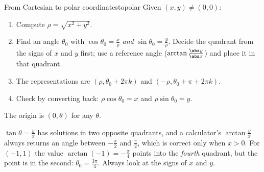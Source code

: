 \documentclass[11pt]{article}
\begin{document}
\begin{proc}{From Cartesian to polar coordinates}{topolar}
Given $(x,y)\ne(0,0)$:
\begin{enumerate}[nosep]
  \item Compute $\rho=\sqrt{x^2+y^2}$.
  \item Find an angle $\theta_0$ with $\cos\theta_0=\frac x\rho$ \emph{and} $\sin\theta_0=\frac y\rho$. Decide the quadrant from the signs of $x$ and $y$ first; use a reference angle ($\arctan\frac{\abs y}{\abs x}$) and place it in that quadrant.
  \item The representations are $(\rho,\theta_0+2\pi k)$ and $(-\rho,\theta_0+\pi+2\pi k)$.
  \item Check by converting back: $\rho\cos\theta_0=x$ and $\rho\sin\theta_0=y$.
\end{enumerate}
The origin is $(0,\theta)$ for any $\theta$.
\end{proc}

\begin{warn}
$\tan\theta=\frac yx$ has solutions in two opposite quadrants, and a calculator's $\arctan\frac yx$ always returns an angle between $-\frac\pi2$ and $\frac\pi2$, which is correct only when $x>0$. For $(-1,1)$ the value $\arctan(-1)=-\frac\pi4$ points into the \emph{fourth} quadrant, but the point is in the second: $\theta_0=\frac{3\pi}4$. Always look at the signs of $x$ and $y$.
\end{warn}
\end{document}
